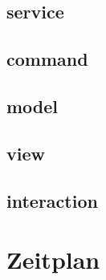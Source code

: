 \documentclass[18pt]{beamer}
\begin{document}
	\subsection{service}
		
	\subsection{command}
		
	\subsection{model}
		
	\subsection{view}
		
	\subsection{interaction}
		

\section{Zeitplan}

\appendix
\beginbackup
\backupend
\end{document}
